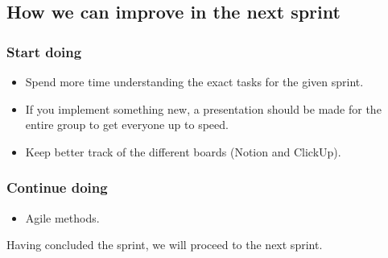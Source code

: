 \subsection{How we can improve in the next sprint}
\subsubsection{Start doing}
\begin{itemize}
    \item Spend more time understanding the exact tasks for the given sprint.
    \item If you implement something new, a presentation should be made for the entire group to get everyone up to speed.
    \item Keep better track of the different boards (Notion and ClickUp).
\end{itemize}
\subsubsection{Continue doing}
\begin{itemize}
    \item Agile methods.
\end{itemize}

Having concluded the sprint, we will proceed to the next sprint.